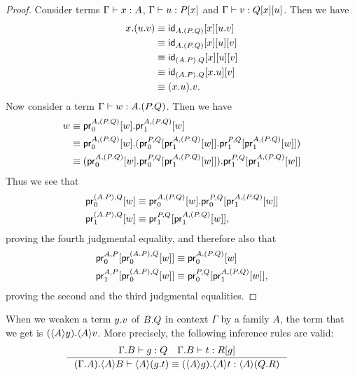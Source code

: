 \begin{proof}
Consider terms $\jterm{\Gamma}{A}{x}$, $\jterm{\Gamma}{\subst{x}{P}}{u}$ and
$\jterm{\Gamma}{\subst{u}{{x}{Q}}}{v}$. Then we have
\begin{align*}
\ctxext{x}{{u}{v}} & \jdeq \subst{\ctxext{u}{v}}{{x}{\idfunc[\ctxext{A}{{P}{Q}}]}}\\
& \jdeq \subst{v}{{u}{{x}{\idfunc[\ctxext{A}{{P}{Q}}]}}}\\
& \jdeq \subst{v}{{u}{{x}{\idfunc[\ctxext{{A}{P}}{Q}]}}}\\
& \jdeq \subst{v}{{\ctxext{x}{u}}{\idfunc[\ctxext{{A}{P}}{Q}]}}\\
& \jdeq \ctxext{{x}{u}}{v}.
\end{align*}
Now consider a term $\jterm{\Gamma}{\ctxext{A}{{P}{Q}}}{w}$. Then we have
\begin{align*}
w 
& \jdeq \ctxext{\cprojfst{A}{\ctxext{P}{Q}}{w}}{\cprojsnd{A}{\ctxext{P}{Q}}{w}}\\
& \jdeq \ctxext{\cprojfst{A}{\ctxext{P}{Q}}{w}}{{\cprojfst{P}{Q}{\cprojsnd{A}{\ctxext{P}{Q}}{w}}}{\cprojsnd{P}{Q}{\cprojsnd{A}{\ctxext{P}{Q}}{w}}}}\\
& \jdeq \ctxext{{\cprojfst{A}{\ctxext{P}{Q}}{w}}{\cprojfst{P}{Q}{\cprojsnd{A}{\ctxext{P}{Q}}{w}}}}{\cprojsnd{P}{Q}{\cprojsnd{A}{\ctxext{P}{Q}}{w}}}
\end{align*}
Thus we see that 
\begin{align*}
\cprojfst{\ctxext{A}{P}}{Q}{w} & \jdeq \ctxext{\cprojfst{A}{\ctxext{P}{Q}}{w}}{\cprojfst{P}{Q}{\cprojsnd{A}{\ctxext{P}{Q}}{w}}}\\ 
\cprojsnd{\ctxext{A}{P}}{Q}{w} & \jdeq \cprojsnd{P}{Q}{\cprojsnd{A}{\ctxext{P}{Q}}{w}},
\end{align*}
proving the fourth judgmental equality, and therefore also that
\begin{align*}
\cprojfst{A}{P}{\cprojfst{\ctxext{A}{P}}{Q}{w}} & \jdeq \cprojfst{A}{\ctxext{P}{Q}}{w}\\
\cprojsnd{A}{P}{\cprojfst{\ctxext{A}{P}}{Q}{w}} & \jdeq \cprojfst{P}{Q}{\cprojsnd{A}{\ctxext{P}{Q}}{w}},
\end{align*}
proving the second and the third judgmental equalities.
\end{proof}

\begin{lem}
When we weaken a term $\ctxext{y}{v}$ of $\ctxext{B}{Q}$ in context $\Gamma$ by
a family $A$, the term that we get is $\ctxext{\ctxwk{A}{y}}{\ctxwk{A}{v}}$. More
precisely, the following inference rules are valid:
\begin{align*}
& \inference
  {\jterm{{\Gamma}{B}}{Q}{g}
   \jterm{{\Gamma}{B}}{\subst{g}{R}}{t}}
  {\jtermeq
    {{{\Gamma}{A}}{\ctxwk{A}{B}}}
    {\ctxwk{A}{\ctxext{Q}{R}}}
    {\ctxwk{A}{\ctxext{g}{t}}}
    {\ctxext{\ctxwk{A}{g}}{\ctxwk{A}{t}}}}
\end{align*}
\end{lem}

